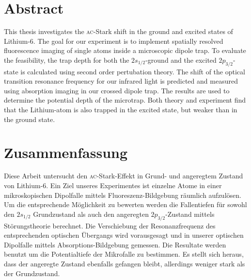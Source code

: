 \section*{Abstract}

This thesis investigates the \textsc{ac}-Stark shift in the ground and excited states of Lithium-6. 
The goal for our experiment is to implement spatially resolved fluorescence imaging of single atoms inside a microscopic dipole trap. To evaluate the feasibility, the trap depth for both the $2s_{1/2}$-ground and the excited $2p_{3/2}$-state is calculated using second order pertubation theory. The shift of the optical transition resonance frequency for our infrared light is predicted and measured using absorption imaging in our crossed dipole trap. The results are used to determine the potential depth of the microtrap. Both theory and experiment find that the Lithium-atom is also trapped in the excited state, but weaker than in the ground state.

\section*{Zusammenfassung}

Diese Arbeit untersucht den \textsc{ac}-Stark-Effekt in Grund- und angeregtem Zustand von Lithium-6. Ein Ziel unseres Experimentes ist einzelne Atome in einer mikroskopischen Dipolfalle mittels Fluoreszenz-Bildgebung räumlich aufzulösen. Um die entsprechende Möglichkeit zu bewerten werden die Fallentiefen für sowohl den $2s_{1/2}$ Grundzustand als auch den angeregten $2p_{3/2}$-Zustand mittels Störungstheorie berechnet. Die Verschiebung der Resonanzfrequenz des entsprechenden optischen Übergangs wird vorausgesagt und in unserer optischen Dipolfalle mittels Absorptions-Bildgebung gemessen. Die Resultate werden benutzt um die Potentialtiefe der Mikrofalle zu bestimmen. Es stellt sich heraus, dass der angeregte Zustand ebenfalls gefangen bleibt, allerdings weniger stark als der Grundzustand.